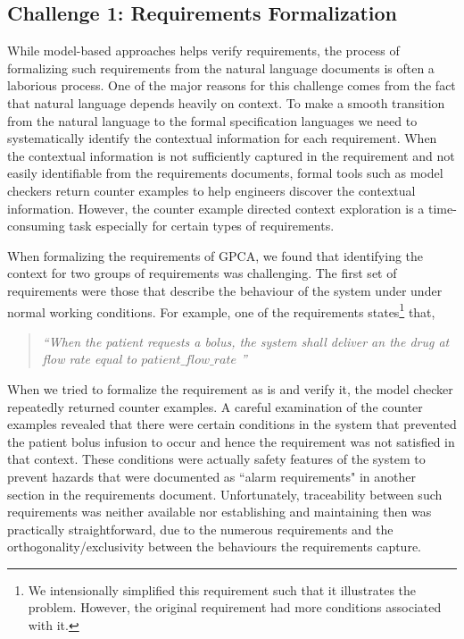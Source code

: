 \subsection{Challenge 1: Requirements Formalization}

While model-based approaches helps verify requirements, the process of formalizing such requirements from the natural language documents is often a laborious process. One of the major reasons for this challenge comes from the fact that natural language depends heavily on context. To make a smooth transition from the natural language to the formal specification languages we need to systematically identify the contextual information for each requirement. When the contextual information is not sufficiently captured in the requirement and not easily identifiable from the requirements documents, formal tools such as model checkers return counter examples to help engineers discover the contextual information. However, the counter example directed context exploration is a time-consuming task especially for certain types of requirements.

When formalizing the requirements of GPCA, we found that identifying the context for two groups of requirements was challenging. The first set of requirements were those that describe the behaviour of the system under under normal working conditions. For example, one of the requirements states\footnote{\scriptsize{We intensionally simplified this requirement such that it illustrates the problem. However, the original requirement had more conditions associated with it.}} that,

\begin{quotation}
\emph{``When the patient requests a bolus, the system shall deliver an the drug at flow rate equal to $patient\_flow\_rate$ ''}
\end{quotation}

When we tried to formalize the requirement as is and verify it, the model checker repeatedly returned counter examples. A careful examination of the counter examples revealed that there were certain conditions in the system that prevented the patient bolus infusion to occur and hence the requirement was not satisfied in that context. These conditions were actually safety features of the system to prevent hazards that were documented as ``alarm requirements" in another section in the requirements document.  Unfortunately, traceability between such requirements was neither available nor establishing and maintaining then was practically straightforward, due to the numerous requirements and the orthogonality/exclusivity between the behaviours the requirements capture.

